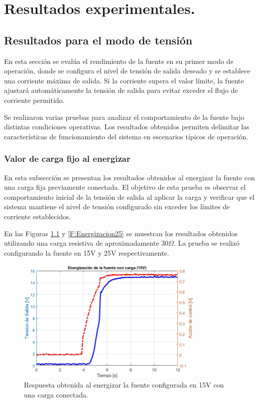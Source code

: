 \chapter{Resultados experimentales.}

\label{C:Resultados_experimentales.}

\section{Resultados para el modo de tensión}
En esta sección se evalúa el rendimiento de la fuente en su primer modo de operación, donde se configura el nivel de tensión de salida deseado y se establece una corriente máxima de salida. Si la corriente supera el valor límite, la fuente ajustará automáticamente la tensión de salida para evitar exceder el flujo de corriente permitido. \par  
Se realizaron varias pruebas para analizar el comportamiento de la fuente bajo distintas condiciones operativas. Los resultados obtenidos permiten delimitar las características de funcionamiento del sistema en escenarios típicos de operación. \par 
\subsection{Valor de carga fijo al energizar}
En esta subsección se presentan los resultados obtenidos al energizar la fuente con una carga fija previamente conectada. El objetivo de esta prueba es observar el comportamiento inicial de la tensión de salida al aplicar la carga y verificar que el sistema mantiene el nivel de tensión configurado sin exceder los límites de corriente establecidos.\par
En las Figuras \ref{F:Energizacion15} y \ref{F:Energizacion25} se muestran los resultados obtenidos utilizando una carga resistiva de aproximadamente $30\Omega$. La prueba se realizó configurando la fuente en 15V y 25V respectivamente.
\begin{figure}[htbp]
    \centering
    \includegraphics[width=0.8\textwidth]{./imagenes/Energizacion15.jpg}
    \caption{Respuesta obtenida al energizar la fuente configurada en 15V con una carga conectada.}
    \label{F:Energizacion15}
\end{figure}

